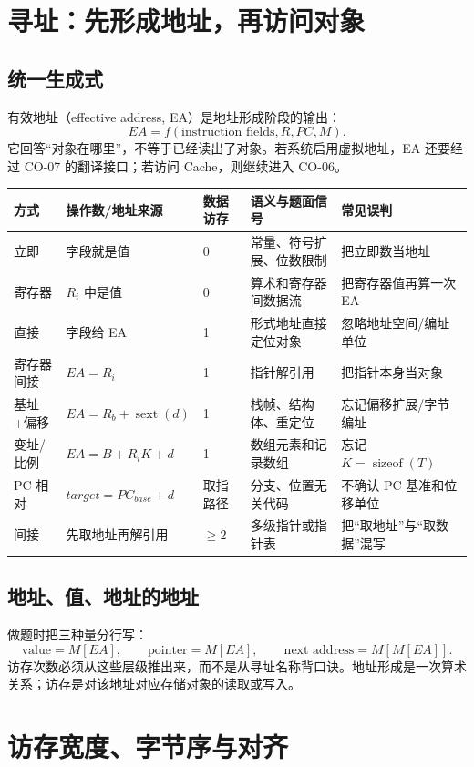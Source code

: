 \documentclass[UTF8,fontset=fandol,11pt,a4paper]{ctexart}
\begin{document}
\section{寻址：先形成地址，再访问对象}

\subsection{统一生成式}
有效地址（effective address, EA）是地址形成阶段的输出：
\[
EA=f(\text{instruction fields},R,PC,M).
\]
它回答“对象在哪里”，不等于已经读出了对象。若系统启用虚拟地址，EA 还要经过 CO-07 的翻译接口；若访问 Cache，则继续进入 CO-06。

\begin{center}
\small
\begin{tabularx}{\linewidth}{L{2.2cm}C{1.8cm}C{1.2cm}Y Y}
\toprule
方式 & 操作数/地址来源 & 数据访存 & 语义与题面信号 & 常见误判\\
\midrule
立即 & 字段就是值 & 0 & 常量、符号扩展、位数限制 & 把立即数当地址\\
寄存器 & $R_i$ 中是值 & 0 & 算术和寄存器间数据流 & 把寄存器值再算一次 EA\\
直接 & 字段给 EA & 1 & 形式地址直接定位对象 & 忽略地址空间/编址单位\\
寄存器间接 & $EA=R_i$ & 1 & 指针解引用 & 把指针本身当对象\\
基址+偏移 & $EA=R_b+\operatorname{sext}(d)$ & 1 & 栈帧、结构体、重定位 & 忘记偏移扩展/字节编址\\
变址/比例 & $EA=B+R_iK+d$ & 1 & 数组元素和记录数组 & 忘记 $K=\operatorname{sizeof}(T)$\\
PC 相对 & $target=PC_{base}+d$ & 取指路径 & 分支、位置无关代码 & 不确认 PC 基准和位移单位\\
间接 & 先取地址再解引用 & $\ge2$ & 多级指针或指针表 & 把“取地址”与“取数据”混写\\
\bottomrule
\end{tabularx}
\end{center}

\subsection{地址、值、地址的地址}
做题时把三种量分行写：
\[
\text{value}=M[EA],\qquad
\text{pointer}=M[EA],\qquad
\text{next address}=M[M[EA]].
\]
访存次数必须从这些层级推出来，而不是从寻址名称背口诀。地址形成是一次算术关系；访存是对该地址对应存储对象的读取或写入。

\section{访存宽度、字节序与对齐}
\end{document}
